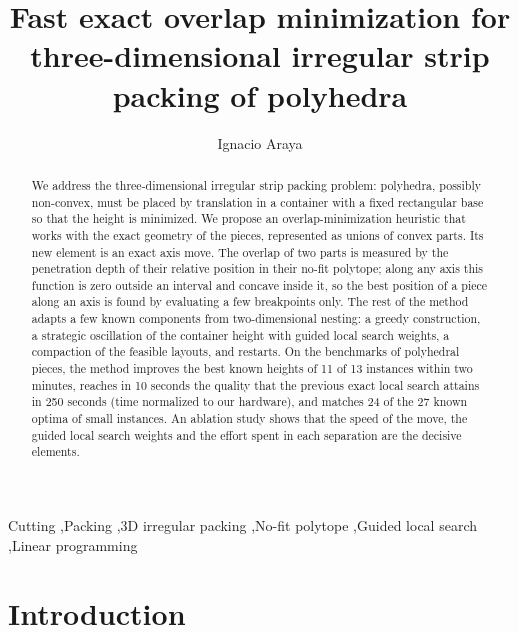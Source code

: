 \documentclass[preprint,12pt,authoryear]{elsarticle}
\begin{document}
\begin{frontmatter}

\title{Fast exact overlap minimization for three-dimensional irregular strip packing of polyhedra}

\author[pucv]{Ignacio Araya}
\address[pucv]{Escuela de Ingenier\'ia Inform\'atica, Pontificia Universidad Cat\'olica de Valpara\'iso, Chile}

\begin{abstract}
We address the three-dimensional irregular strip packing problem: polyhedra, possibly non-convex, must be placed
by translation in a container with a fixed rectangular base so that the height is minimized. We propose an
overlap-minimization heuristic that works with the exact geometry of the pieces, represented as unions of convex
parts. Its new element is an exact axis move. The overlap of two parts is measured by the penetration depth of
their relative position in their no-fit polytope; along any axis this function is zero outside an interval and
concave inside it, so the best position of a piece along an axis is found by evaluating a few breakpoints only.
The rest of the method adapts a few known components from two-dimensional nesting: a greedy
construction, a strategic oscillation of the container height with guided local search weights, a
compaction of the feasible layouts, and restarts. On the benchmarks of polyhedral pieces, the method improves the best known heights of
11 of 13 instances within two minutes, reaches in 10 seconds the quality that the previous exact local search
attains in 250 seconds (time normalized to our hardware), and matches 24 of the 27 known optima of small
instances. An ablation study shows that the speed of the move, the guided local search weights and the effort
spent in each separation are the decisive elements.
\end{abstract}

\begin{keyword}
Cutting \sep Packing \sep 3D irregular packing \sep No-fit polytope \sep Guided local search \sep Linear programming
\end{keyword}

\end{frontmatter}

\section{Introduction}
\end{document}
